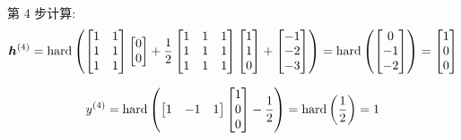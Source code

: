 \documentclass{article}
\begin{document}
第 4 步计算:
\begin{equation}
  \bm{h}^{(4)}
  =\operatorname{hard}\left(
    \begin{bmatrix}
      1 & 1 \\
      1 & 1 \\
      1 & 1 \\
    \end{bmatrix}
    \begin{bmatrix}
      0 \\ 0 \\
    \end{bmatrix}
    +\frac{1}{2}
    \begin{bmatrix}
      1 & 1 & 1 \\
      1 & 1 & 1 \\
      1 & 1 & 1 \\
    \end{bmatrix}
    \begin{bmatrix}
      1 \\ 1 \\ 0 \\
    \end{bmatrix}
    +
    \begin{bmatrix}
      -1 \\ -2 \\ -3 \\
    \end{bmatrix}
  \right)
  =\operatorname{hard}\left(
    \begin{bmatrix}
      0 \\ -1 \\ -2 \\
    \end{bmatrix}
  \right)
  =
  \begin{bmatrix}
    1 \\ 0 \\ 0 \\
  \end{bmatrix}
\end{equation}

\begin{equation}
  y^{(4)}
  =\operatorname{hard}\left(
    \begin{bmatrix}
      1 & -1 & 1 \\
    \end{bmatrix}
    \begin{bmatrix}
      1 \\ 0 \\ 0 \\
    \end{bmatrix}
    -\frac{1}{2}
  \right)
  =\operatorname{hard}\left(
    \frac{1}{2}
  \right)
  =1
\end{equation}
\end{document}
